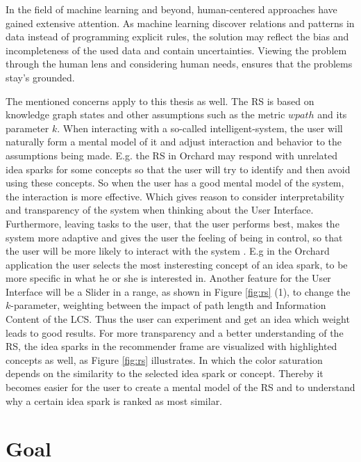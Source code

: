 \documentclass[pdftex,a4paper,12pt]{scrartcl}
\theoremstyle{definition}
\begin{document}
In the field of machine learning and beyond, human-centered approaches have gained extensive attention. As machine learning discover relations and patterns in data instead of programming explicit rules, the solution may reflect the bias and incompleteness of the used data and contain uncertainties. 
Viewing the problem through the human lens and considering human needs, ensures that the problems stay's grounded. 

The mentioned concerns apply to this thesis as well. The RS is based on knowledge graph states and other assumptions such as the metric $wpath$ and its parameter $k$. When interacting with a so-called intelligent-system, the user will naturally form a mental model of it and adjust interaction and behavior to the assumptions being made. E.g. the RS in Orchard may respond with unrelated idea sparks for some concepts so that the user will try to identify and then avoid using these concepts. So when the user has a good mental model of the system, the interaction is more effective. Which gives reason to consider interpretability and transparency of the system when thinking about the User Interface. Furthermore, leaving tasks to the user, that the user performs best, makes the system more adaptive and gives the user the feeling of being in control, so that the user will be more likely to interact with the system \citep{abdul_trends_2018}. E.g in the Orchard application the user selects the most insteresting concept of an idea spark, to be more specific in what he or she is interested in. Another feature for the User Interface will be a Slider in a range, as shown in Figure \ref{fig:rs} (1), to change the $k$-parameter, weighting between the impact of path length and Information Content of the LCS. Thus the user can experiment and get an idea which weight leads to good results. For more transparency and a better understanding of the RS, the idea sparks in the recommender frame are visualized with highlighted concepts as well, as Figure \ref{fig:rs} illustrates. In which the color saturation depends on the similarity to the selected idea spark or concept. Thereby it becomes easier for the user to create a mental model of the RS and to understand why a certain idea spark is ranked as most similar.

\section{Goal} 
    
\end{document}
